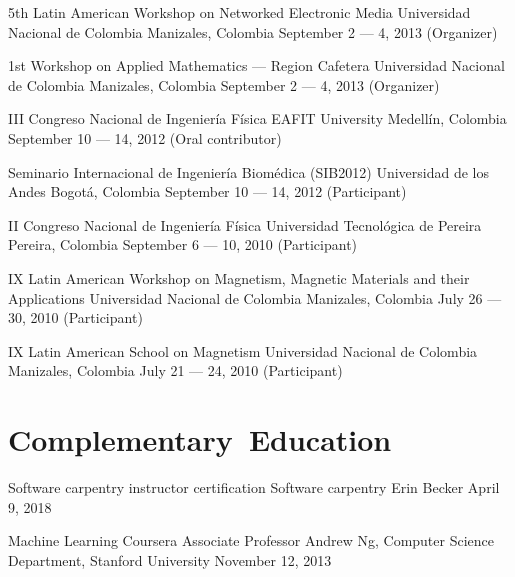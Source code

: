 \documentclass[12pt,english]{moderncv}
\begin{document}
        {5th Latin American Workshop on Networked Electronic Media}
        {Universidad Nacional de Colombia}
        {Manizales, Colombia}
        {September 2 --- 4, 2013}
        {(Organizer)}


        {1st Workshop on Applied Mathematics --- Region Cafetera}
        {Universidad Nacional de Colombia}
        {Manizales, Colombia}
        {September 2 --- 4, 2013}
        {(Organizer)}

        {III Congreso Nacional de Ingeniería Física}
        {EAFIT University}
        {Medellín, Colombia}
        {September 10 --- 14, 2012}
        {(Oral contributor)}

        {Seminario Internacional de Ingeniería Biomédica (SIB2012)}
        {Universidad de los Andes}
        {Bogotá, Colombia}
        {September 10 --- 14, 2012}
        {(Participant)}

        {II Congreso Nacional de Ingeniería Física}
        {Universidad Tecnol\'ogica de Pereira}
        {Pereira, Colombia}
        {September 6 --- 10, 2010}
        {(Participant)}

        {IX Latin American Workshop on Magnetism, Magnetic Materials and their Applications}
        {Universidad Nacional de Colombia}
        {Manizales, Colombia}
        {July 26 --- 30, 2010}
        {(Participant)}

        {IX Latin American School on Magnetism}
        {Universidad Nacional de Colombia}
        {Manizales, Colombia}
        {July 21 --- 24, 2010}
        {(Participant)}


\section{Complementary~Education}

        {Software carpentry instructor certification}
        {}
        {Software carpentry}
        {Erin Becker}
        {April 9, 2018}

        {Machine Learning}
        {}
        {Coursera}
        {Associate Professor Andrew Ng, Computer Science Department, Stanford University}
        {November 12, 2013}
\end{document}

